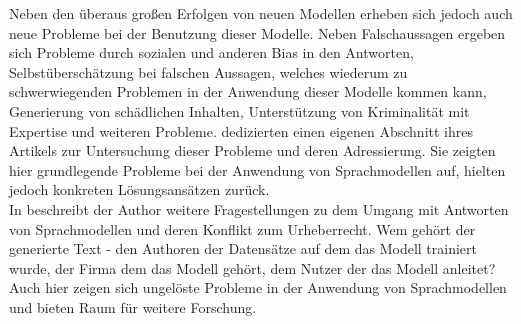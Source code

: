 Neben den überaus großen Erfolgen von neuen Modellen erheben sich jedoch auch neue Probleme bei der Benutzung dieser Modelle.
Neben Falschaussagen ergeben sich Probleme durch sozialen und anderen Bias in den Antworten, Selbstüberschätzung bei falschen Aussagen, welches wiederum zu schwerwiegenden Problemen in der Anwendung dieser Modelle kommen kann, Generierung von schädlichen Inhalten, Unterstützung von Kriminalität mit Expertise und weiteren Probleme.
\citet{gpt4} dedizierten einen eigenen Abschnitt ihres Artikels zur Untersuchung dieser Probleme und deren Adressierung.
Sie zeigten hier grundlegende Probleme bei der Anwendung von Sprachmodellen auf, hielten jedoch konkreten Lösungsansätzen zurück.\\

In \citet{plagiarism} beschreibt der Author weitere Fragestellungen zu dem Umgang mit Antworten von Sprachmodellen und deren Konflikt zum Urheberrecht.
Wem gehört der generierte Text - den Authoren der Datensätze auf dem das Modell trainiert wurde, der Firma dem das Modell gehört, dem Nutzer der das Modell anleitet? 
Auch hier zeigen sich ungelöste Probleme in der Anwendung von Sprachmodellen und bieten Raum für weitere Forschung.\\
